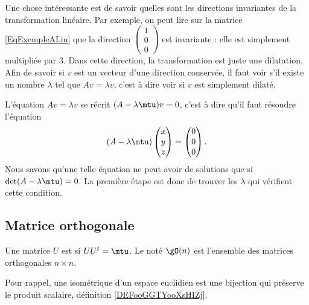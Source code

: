 Une chose intéressante est de savoir quelles sont les directions invariantes de la transformation linéaire. Par exemple, on peut lire sur la matrice \eqref{EqExempleALin} que la direction $\begin{pmatrix}
	1	\\ 
	0	\\ 
	0	
\end{pmatrix}$ est invariante : elle est simplement multipliée par $3$. Dans cette direction, la transformation est juste une dilatation. Afin de savoir si $v$ est un vecteur d'une direction conservée, il faut voir s'il existe un nombre $\lambda$ tel que $Av=\lambda v$, c'est à dire voir si $v$ est simplement dilaté.

L'équation $Av=\lambda v$ se récrit $(A-\lambda\mtu)v=0$, c'est à dire qu'il faut résoudre l'équation
\begin{equation}
	(A-\lambda\mtu)\begin{pmatrix}
		x	\\ 
		y	\\ 
		z	
	\end{pmatrix}=
	\begin{pmatrix}
		0	\\ 
		0	\\ 
		0	
	\end{pmatrix}.
\end{equation}
Nous savons qu'une telle équation ne peut avoir de solutions que si $\det(A-\lambda\mtu)=0$. La première étape est donc de trouver les $\lambda$ qui vérifient cette condition.

\subsection{Matrice orthogonale}

\begin{definition}      \label{DEFooUHANooLVBVID}
    Une matrice \( U\) est  si \( UU^t=\mtu\). Le  noté \( \gO(n)\) est l'ensemble des matrices orthogonales \( n\times n\).
\end{definition}

Pour rappel, une isométrique d'un espace euclidien est une bijection qui préserve le produit scalaire, définition \ref{DEFooGGTYooXsHIZj}.

